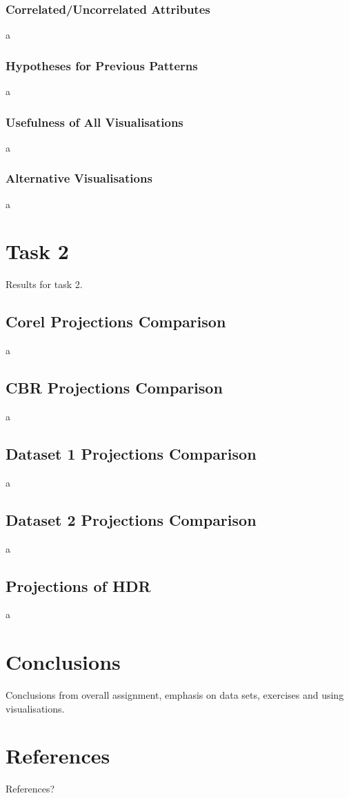 \documentclass[11pt,a4paper,final]{article}
\begin{document}
\begin{multicols}{2}
\subsubsection{Correlated/Uncorrelated Attributes}
a

\subsubsection{Hypotheses for Previous Patterns}
a

\subsubsection{Usefulness of All Visualisations}
a

\subsubsection{Alternative Visualisations}
a


\section{Task 2}
Results for task 2.
\subsection{Corel Projections Comparison}
a

\subsection{CBR Projections Comparison}
a

\subsection{Dataset 1 Projections Comparison}
a

\subsection{Dataset 2 Projections Comparison}
a

\subsection{Projections of HDR}
a


\section{Conclusions}
Conclusions from overall assignment, emphasis on data sets, exercises and using visualisations.


\section{References}
References?

\end{multicols}
\end{document}
